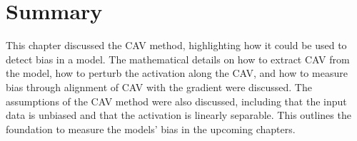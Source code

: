 \section{Summary}
This chapter discussed the CAV method, highlighting how it could be used to detect bias in a model. The mathematical details on how to extract CAV from the model, how to perturb the activation along the CAV, and how to measure bias through alignment of CAV with the gradient were discussed. The assumptions of the CAV method were also discussed, including that the input data is unbiased and that the activation is linearly separable. This outlines the foundation to measure the models' bias in the upcoming chapters.